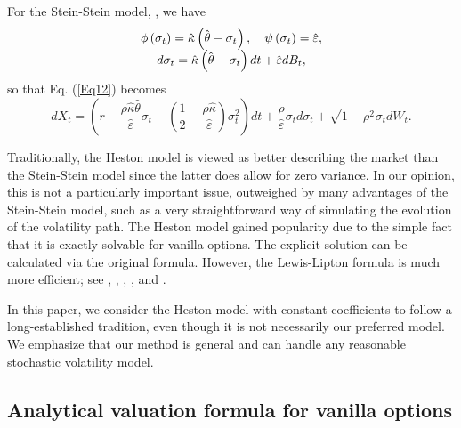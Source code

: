 \documentclass{article}
\begin{document}
For the Stein-Stein model, \cite{Stein1991}, we have%
\begin{equation}
\begin{array}{c}
\phi \left( \sigma _{t}\right) =\hat{\kappa}\left( \hat{\theta}-\sigma
_{t}\right) ,\ \ \ \psi \left( \sigma _{t}\right) =\hat{\varepsilon}, \\ 
d\sigma _{t}=\hat{\kappa}\left( \hat{\theta}-\sigma _{t}\right) dt+\hat{%
\varepsilon}dB_{t},%
\end{array}
\label{Eq14}
\end{equation}%
so that Eq. (\ref{Eq12}) becomes 
\begin{equation}
dX_{t}=\left( r-\frac{\rho \hat{\kappa}\hat{\theta}}{\hat{\varepsilon}}%
\sigma _{t}-\left( \frac{1}{2}-\frac{\rho \hat{\kappa}}{\hat{\varepsilon}}%
\right) \sigma _{t}^{2}\right) dt+\frac{\rho }{\hat{\varepsilon}}\sigma
_{t}d\sigma _{t}+\sqrt{1-\rho ^{2}}\sigma _{t}dW_{t}.  \label{Eq16}
\end{equation}

Traditionally, the Heston model is viewed as better describing the market
than the Stein-Stein model since the latter does allow for zero variance. In
our opinion, this is not a particularly important issue, outweighed by many
advantages of the Stein-Stein model, such as a very straightforward way of
simulating the evolution of the volatility path. The Heston model gained
popularity due to the simple fact that it is exactly solvable for vanilla
options. The explicit solution can be calculated via the original \cite%
{Heston1993} formula. However, the Lewis-Lipton formula is much more
efficient; see \cite{Lewis2000}, \cite{Lipton2001}, \cite{Lipton2002a}, \cite%
{Lipton2008}, and \cite{Schmeltze2010}.

In this paper, we consider the Heston model with constant coefficients to
follow a long-established tradition, even though it is not necessarily our
preferred model. We emphasize that our method is general and can handle any
reasonable stochastic volatility model.

\subsection{Analytical valuation formula for vanilla options\label{Sec22}}
\end{document}
